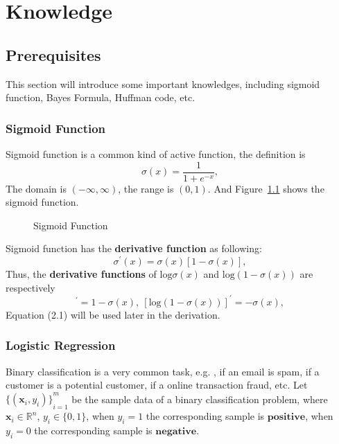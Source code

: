 \chapter{Knowledge}
\label{cha:knowledgei}

\section{Prerequisites}
This section will introduce some important knowledges, including sigmoid function, Bayes Formula, Huffman code, etc.

\subsection{Sigmoid Function}
Sigmoid function is a common kind of active function, the definition is
$$ \sigma(x) = \frac{1}{1+e^{-x}}, $$
The domain is $(-\infty, \infty)$, the range is $(0,1)$. And Figure~\ref{fig:sigmoid} shows the sigmoid function.
\begin{figure}[!ht]
  \centering
	\caption{Sigmoid Function}
	\label{fig:sigmoid}
\end{figure}

Sigmoid function has the \textbf{derivative function} as following:
$$ \sigma^\prime(x) = \sigma(x)[1-\sigma(x)], $$
Thus, the \textbf{derivative functions} of $\mathrm{log}\sigma(x)$ and $\mathrm{log}(1-\sigma(x))$ are respectively
\begin{equation} 
[\mathrm{log}\sigma(x)]^\prime = 1-\sigma(x), \ [\mathrm{log}(1-\sigma(x))]^\prime = -\sigma(x), 
\end{equation}
Equation (2.1) will be used later in the derivation.

\subsection{Logistic Regression}
Binary classification is a very common task, e.g. , if an email is spam, if a customer is a potential customer, if a online transaction fraud, etc. Let ${\{(\mathbf{x}_i,y_i)\}}^m_{i=1}$ be the sample data of a binary classification problem, where $\mathbf{x}_i \in \mathbb{R}^n$, $y_i \in \{0,1\}$, when $y_i = 1$ the corresponding sample is $\mathbf{positive}$, when $y_i = 0$ the corresponding sample is $\mathbf{negative}$.

